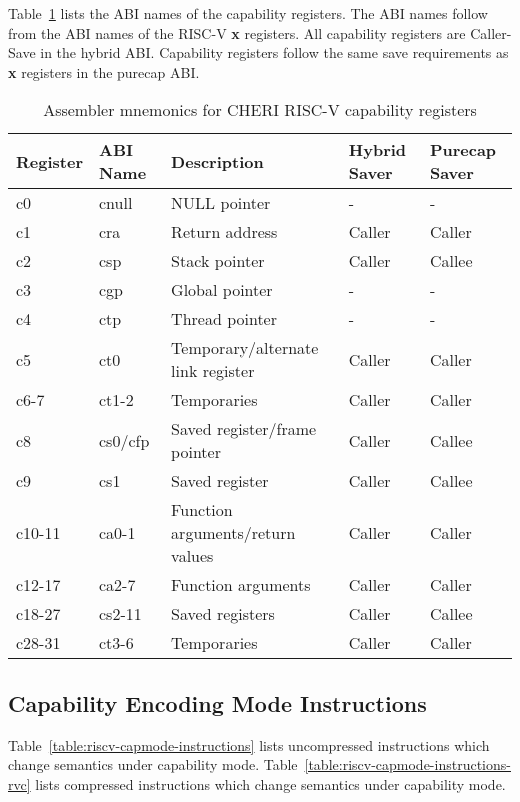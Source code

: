 {	Table~\ref{table:riscv-register-names} lists the ABI names of
	the capability registers.  The ABI names follow from the ABI
	names of the RISC-V \textbf{x} registers.  All capability registers are
	Caller-Save in the hybrid ABI.	Capability registers follow
	the same save requirements as \textbf{x} registers in the purecap ABI.

\begin{table}[h]
\begin{center}
\begin{tabular}{lllll}
\toprule
Register & ABI Name & Description						& Hybrid Saver & Purecap Saver \\
\midrule
c0	& cnull		& NULL pointer					& -		& - \\
c1	& cra		& Return address					& Caller	& Caller \\
c2	& csp		& Stack pointer					& Caller	& Callee \\
c3	& cgp		& Global pointer					& -		& - \\
c4	& ctp		& Thread pointer					& -		& - \\
c5	& ct0		& Temporary/alternate link register	& Caller	& Caller \\
c6-7 & ct1-2		& Temporaries						& Caller	& Caller \\
c8	& cs0/cfp	& Saved register/frame pointer		& Caller	& Callee \\
c9	& cs1		& Saved register					& Caller	& Callee \\
c10-11 & ca0-1	& Function arguments/return values	& Caller	& Caller \\
c12-17 & ca2-7	& Function arguments				& Caller	& Caller \\
c18-27 & cs2-11	& Saved registers					& Caller	& Callee \\
c28-31 & ct3-6	& Temporaries						& Caller	& Caller \\
\bottomrule
\end{tabular}
\end{center}
\caption{Assembler mnemonics for CHERI RISC-V capability registers}
\label{table:riscv-register-names}
\end{table}

	\subsection{Capability Encoding Mode Instructions}

	Table~\ref{table:riscv-capmode-instructions} lists uncompressed
	instructions which change semantics under capability mode.
	Table~\ref{table:riscv-capmode-instructions-rvc} lists compressed
	instructions which change semantics under capability mode.

}
